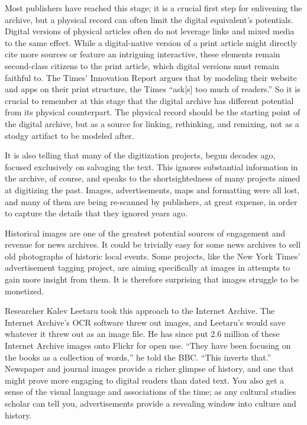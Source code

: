 Most publishers have reached this stage; it is a crucial first step for enlivening the archive, but a physical record can often limit the digital equivalent's potentials. Digital versions of physical articles often do not leverage links and mixed media to the same effect. While a digital-native version of a print article might directly cite more sources or feature an intriguing interactive, these elements remain second-class citizens to the print article, which digital versions must remain faithful to. The Times' Innovation Report argues that by modeling their website and apps on their print structure, the Times ``ask[s] too much of readers.'' So it is crucial to remember at this stage that the digital archive has different potential from its physical counterpart. The physical record should be the starting point of the digital archive, but as a source for linking, rethinking, and remixing, not as a stodgy artifact to be modeled after.


It is also telling that many of the digitization projects, begun decades ago, focused exclusively on salvaging the text. This ignores substantial information in the archive, of course, and speaks to the shortsightedness of many projects aimed at digitizing the past. Images, advertisements, maps and formatting were all lost, and many of them are being re-scanned by publishers, at great expense, in order to capture the details that they ignored years ago.

Historical images are one of the greatest potential sources of engagement and revenue for news archives. It could be trivially easy for some news archives to sell old photographs of historic local events. Some projects, like the New York Times' advertisement tagging project, are aiming specifically at images in attempts to gain more insight from them. It is therefore surprising that images struggle to be monetized. 

Researcher Kalev Leetaru took this approach to the Internet Archive. The Internet Archive's OCR software threw out images, and Leetaru's would save whatever it threw out as an image file. He has since put 2.6 million of these Internet Archive images onto Flickr for open use. ``They have been focusing on the books as a collection of words,'' he told the BBC. ``This inverts that.''\autocite{bbc_leetaru} Newspaper and journal images provide a richer glimpse of history, and one that might prove more engaging to digital readers than dated text. You also get a sense of the visual language and associations of the time; as any cultural studies scholar can tell you, advertisements provide a revealing window into culture and history.

